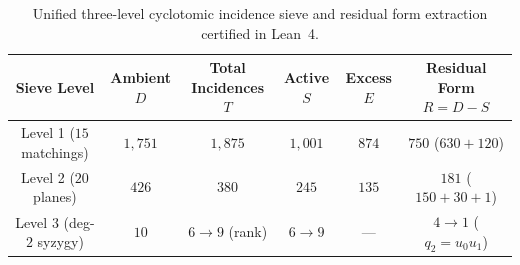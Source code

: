 \documentclass[11pt,a4paper]{article}
\begin{document}
\begin{table}[htbp]
  \centering
  \footnotesize
  \setlength{\tabcolsep}{4pt}
  \caption{Unified three-level cyclotomic incidence sieve and residual form extraction certified in Lean~4.}
  \label{tab:three_level_sieve}
  \begin{tabular}{cccccc}
    \toprule
    Sieve Level & Ambient $D$ & Total Incidences $T$ & Active $S$ & Excess $E$ & Residual Form $R = D - S$ \\
    \midrule
    Level 1 ($15$ matchings) & $1{,}751$ & $1{,}875$ & $1{,}001$ & $874$ & $750$ ($630 + 120$) \\
    Level 2 ($20$ planes) & $426$ & $380$ & $245$ & $135$ & $181$ ($150 + 30 + 1$) \\
    Level 3 (deg-$2$ syzygy) & $10$ & $6 \to 9$ (rank) & $6 \to 9$ & --- & $4 \to 1$ ($q_2 = u_0 u_1$) \\
    \bottomrule
  \end{tabular}
\end{table}
\end{document}
